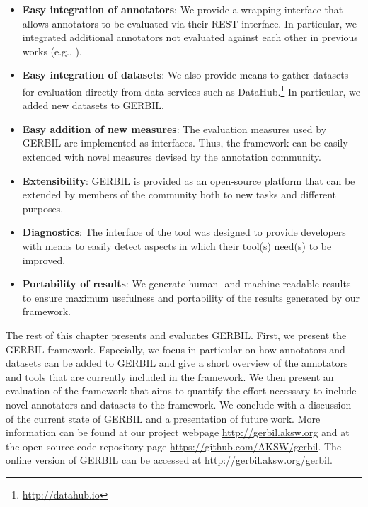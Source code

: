 \begin{itemize}
\item \textbf{Easy integration of annotators}: We provide a wrapping interface that allows annotators to be evaluated via their REST interface. In particular, we integrated \numberOfadditionalAnnotators additional annotators not evaluated against each other in previous works (e.g., \cite{cornolti}).  
\item \textbf{Easy integration of datasets}: We also provide means to gather datasets for evaluation directly from data services such as DataHub.\footnote{\url{http://datahub.io}} In particular, we added \numberOfadditionalDatasets new datasets to GERBIL.
\item \textbf{Easy addition of new measures}: The evaluation measures used by GERBIL are implemented as interfaces. Thus, the framework can be easily extended with novel measures devised by the annotation community.
\item \textbf{Extensibility}: GERBIL is provided as an open-source platform that can be extended by members of the community both to new tasks and different purposes.
\item \textbf{Diagnostics}: The interface of the tool was designed to provide developers with means to easily detect aspects in which their tool(s) need(s) to be improved. 
\item \textbf{Portability of results}: We generate human- and machine-readable results to ensure maximum usefulness and portability of the results generated by our framework. 
\end{itemize}


The rest of this chapter presents and evaluates GERBIL. 
First, we present the GERBIL framework.
Especially, we focus in particular on how annotators and datasets can be added to GERBIL and give a short overview of the annotators and tools that are currently included in the framework. 
We then present an evaluation of the framework that aims to quantify the effort necessary to include novel annotators and datasets to the framework. 
We conclude with a discussion of the current state of GERBIL and a presentation of future work. 
More information can be found at our project webpage \url{http://gerbil.aksw.org} and at the open source code repository page \url{https://github.com/AKSW/gerbil}.
The online version of GERBIL can be accessed at \url{http://gerbil.aksw.org/gerbil}.


